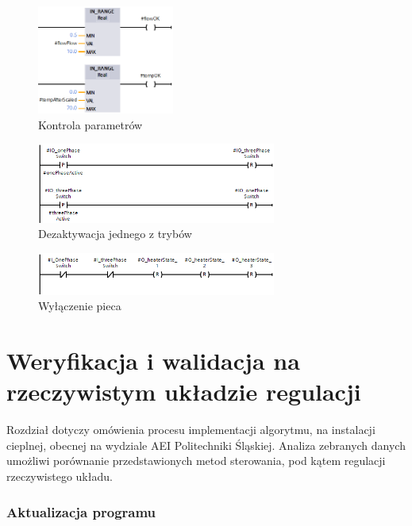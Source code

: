 \documentclass[a4paper,twoside,12pt]{book}
\begin{document}
\begin{figure}[h]
	\centering
	\includegraphics[width=0.4\textwidth]{./img/safety1.png}
	\caption{Kontrola parametrów}
	\label{fig:Kontrola parametrów}
\end{figure}

\begin{figure}[h]
	\centering
	\includegraphics[width=0.7\textwidth]{./img/safety2.png}
	\caption{Dezaktywacja jednego z trybów}
	\label{fig:Dezaktywacja trybu}
\end{figure}

\begin{figure}[h]
	\centering
	\includegraphics[width=0.7\textwidth]{./img/safety3.png}
	\caption{Wyłączenie pieca}
	\label{fig:Wyłączenie pieca}
\end{figure}

\chapter{Weryfikacja i walidacja na rzeczywistym układzie regulacji}
\label{ch:06}
Rozdział dotyczy omówienia procesu implementacji algorytmu, na instalacji cieplnej, obecnej na wydziale AEI Politechniki Śląskiej. Analiza zebranych danych umożliwi porównanie przedstawionych metod sterowania, pod kątem regulacji rzeczywistego układu.

\subsection{Aktualizacja programu}
\end{document}

